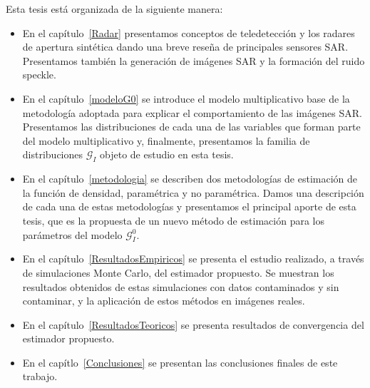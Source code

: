 Esta tesis está organizada de la siguiente manera:
\begin{itemize}
	\item En el capítulo~\ref{Radar} presentamos conceptos de teledetección y los radares de apertura sintética dando una breve reseña de principales sensores SAR. Presentamos también la generación de imágenes SAR y  la formación del ruido speckle.
	\item En el capítulo~\ref{modeloG0} se introduce el modelo multiplicativo base de la metodología adoptada para explicar el comportamiento de las imágenes SAR. Presentamos las distribuciones de cada una de las variables que forman parte del modelo multiplicativo y, finalmente, presentamos la familia de distribuciones $\mathcal{G}_I$ objeto de estudio en esta tesis.
	\item En el capítulo~\ref{metodologia}  se describen dos metodologías de estimación de la función de densidad, paramétrica y no paramétrica. Damos una descripción de cada una de estas metodologías y presentamos el principal aporte de esta tesis, que es la propuesta de un nuevo método de estimación para los parámetros del modelo $\mathcal G_I^0$.
	\item En el capítulo~\ref{ResultadosEmpiricos} se presenta el estudio realizado, a través de simulaciones Monte Carlo, del estimador propuesto. Se muestran los resultados obtenidos de estas simulaciones  con datos contaminados y sin contaminar, y la aplicación de estos métodos en imágenes reales.
	\item En el capítulo~\ref{ResultadosTeoricos} se presenta resultados de convergencia del estimador propuesto.
	\item En el capítlo~\ref{Conclusiones} se presentan las conclusiones finales de este trabajo.
	
\end{itemize}

